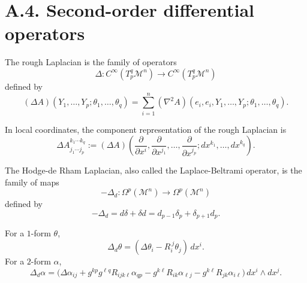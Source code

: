 \section*{A.4. Second-order differential operators}

\begin{definition}
\label{appa-def-rough-laplacian}


The rough Laplacian is the family of operators
\[
\Delta : C^\infty(T_p^q \mathcal M^n)\to C^\infty(T_p^q \mathcal M^n)
\]
defined by
\[
(\Delta A)(Y_1,\ldots,Y_p;\theta_1,\ldots,\theta_q)
= \sum_{i=1}^n (\nabla^2 A)(e_i,e_i,Y_1,\ldots,Y_p;\theta_1,\ldots,\theta_q).
\]
\end{definition}

\begin{definition}
\label{appa-def-rough-laplacian-components}


In local coordinates, the component representation of the rough Laplacian is
\[
\Delta A^{k_1\cdots k_q}_{j_1\cdots j_p}
:= (\Delta A)\!\left(\frac{\partial}{\partial x^i},\frac{\partial}{\partial x^{j_1}},\ldots,\frac{\partial}{\partial x^{j_p}};dx^{k_1},\ldots,dx^{k_q}\right).
\]
\end{definition}

\begin{definition}
\label{appa-def-hodge-de-rham-laplacian}


The Hodge-de Rham Laplacian, also called the Laplace-Beltrami operator, is the family of maps
\[
-\Delta_d:\Omega^p(\mathcal M^n)\to \Omega^p(\mathcal M^n)
\]
defined by
\[
-\Delta_d=d\delta+\delta d=d_{p-1}\delta_p+\delta_{p+1}d_p.
\]
\end{definition}

\begin{remark}
\label{appa-rem-hodge-laplacian-components}

For a \(1\)-form \(\theta\),
\[
\Delta_d\theta=(\Delta\theta_i-R_i^{\ j}\theta_j)\,dx^i.
\]
For a \(2\)-form \(\alpha\),
\[
\Delta_d\alpha
= \bigl(\Delta \alpha_{ij} + g^{kp}g^{\ell q}R_{ijk\ell}\alpha_{qp}
- g^{k\ell}R_{ik}\alpha_{\ell j}
- g^{k\ell}R_{jk}\alpha_{i\ell}\bigr)\,dx^i\wedge dx^j.
\]
\end{remark}

